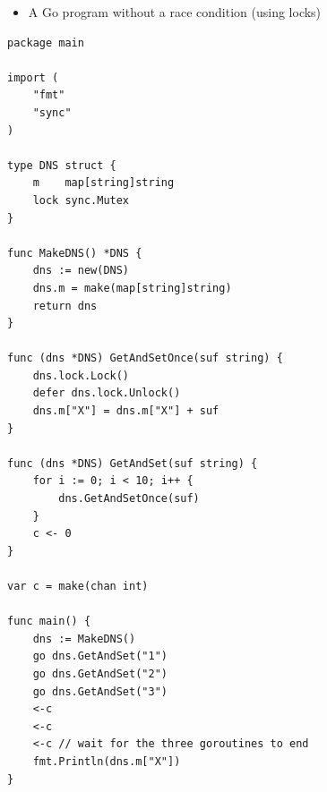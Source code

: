 \documentclass[11pt]{article}
\begin{document}
\begin{itemize}
\item A Go program without a race condition (using locks)
\end{itemize}
\begin{verbatim}
package main

import (
	"fmt"
	"sync"
)

type DNS struct {
	m    map[string]string
	lock sync.Mutex
}

func MakeDNS() *DNS {
	dns := new(DNS)
	dns.m = make(map[string]string)
	return dns
}

func (dns *DNS) GetAndSetOnce(suf string) {
	dns.lock.Lock()
	defer dns.lock.Unlock()
	dns.m["X"] = dns.m["X"] + suf
}

func (dns *DNS) GetAndSet(suf string) {
	for i := 0; i < 10; i++ {
		dns.GetAndSetOnce(suf)
	}
	c <- 0
}

var c = make(chan int)

func main() {
	dns := MakeDNS()
	go dns.GetAndSet("1")
	go dns.GetAndSet("2")
	go dns.GetAndSet("3")
	<-c
	<-c
	<-c // wait for the three goroutines to end
	fmt.Println(dns.m["X"])
}
\end{verbatim}
\end{document}
